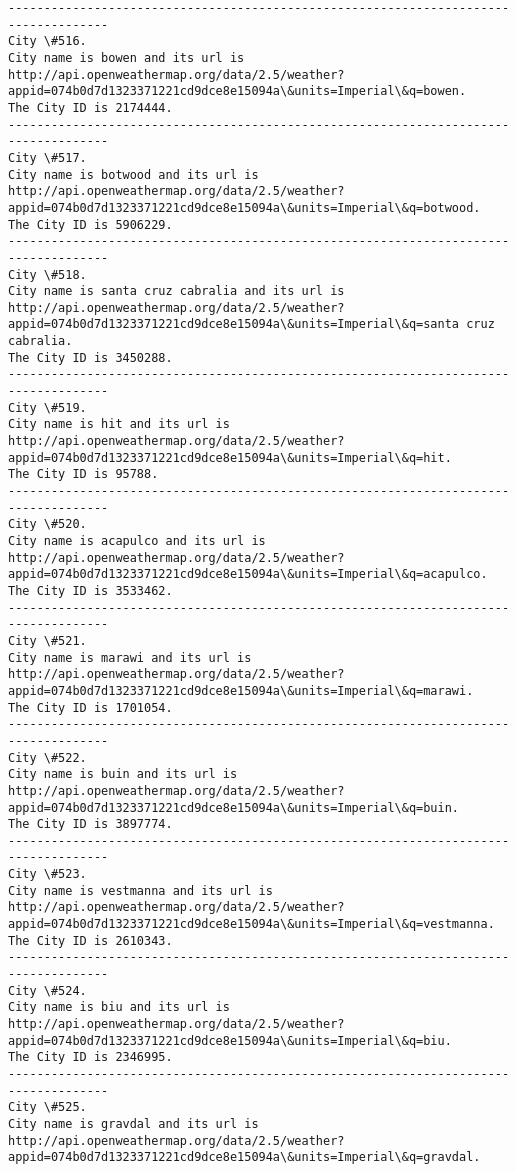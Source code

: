 \documentclass[11pt]{article}
\begin{document}
\begin{Verbatim}[commandchars=\\\{\}]
------------------------------------------------------------------------------------
City \#516.
City name is bowen and its url is http://api.openweathermap.org/data/2.5/weather?appid=074b0d7d1323371221cd9dce8e15094a\&units=Imperial\&q=bowen.
The City ID is 2174444.
------------------------------------------------------------------------------------
City \#517.
City name is botwood and its url is http://api.openweathermap.org/data/2.5/weather?appid=074b0d7d1323371221cd9dce8e15094a\&units=Imperial\&q=botwood.
The City ID is 5906229.
------------------------------------------------------------------------------------
City \#518.
City name is santa cruz cabralia and its url is http://api.openweathermap.org/data/2.5/weather?appid=074b0d7d1323371221cd9dce8e15094a\&units=Imperial\&q=santa cruz cabralia.
The City ID is 3450288.
------------------------------------------------------------------------------------
City \#519.
City name is hit and its url is http://api.openweathermap.org/data/2.5/weather?appid=074b0d7d1323371221cd9dce8e15094a\&units=Imperial\&q=hit.
The City ID is 95788.
------------------------------------------------------------------------------------
City \#520.
City name is acapulco and its url is http://api.openweathermap.org/data/2.5/weather?appid=074b0d7d1323371221cd9dce8e15094a\&units=Imperial\&q=acapulco.
The City ID is 3533462.
------------------------------------------------------------------------------------
City \#521.
City name is marawi and its url is http://api.openweathermap.org/data/2.5/weather?appid=074b0d7d1323371221cd9dce8e15094a\&units=Imperial\&q=marawi.
The City ID is 1701054.
------------------------------------------------------------------------------------
City \#522.
City name is buin and its url is http://api.openweathermap.org/data/2.5/weather?appid=074b0d7d1323371221cd9dce8e15094a\&units=Imperial\&q=buin.
The City ID is 3897774.
------------------------------------------------------------------------------------
City \#523.
City name is vestmanna and its url is http://api.openweathermap.org/data/2.5/weather?appid=074b0d7d1323371221cd9dce8e15094a\&units=Imperial\&q=vestmanna.
The City ID is 2610343.
------------------------------------------------------------------------------------
City \#524.
City name is biu and its url is http://api.openweathermap.org/data/2.5/weather?appid=074b0d7d1323371221cd9dce8e15094a\&units=Imperial\&q=biu.
The City ID is 2346995.
------------------------------------------------------------------------------------
City \#525.
City name is gravdal and its url is http://api.openweathermap.org/data/2.5/weather?appid=074b0d7d1323371221cd9dce8e15094a\&units=Imperial\&q=gravdal.

\end{Verbatim}
\end{document}
